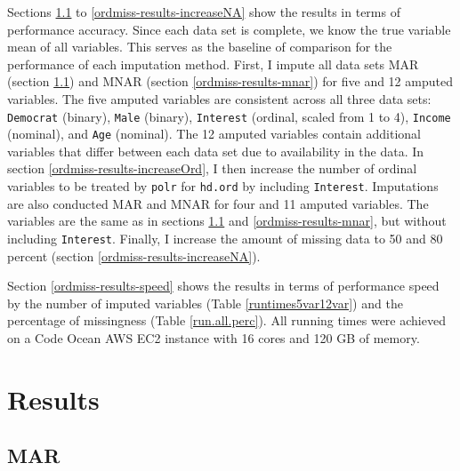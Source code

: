\documentclass[12pt,econ]{sources/authesis}
\begin{document}
Sections \ref{ordmiss-results-mar} to \ref{ordmiss-results-increaseNA} show the results in terms of performance accuracy. Since each data set is complete, we know the true variable mean of all variables. This serves as the baseline of comparison for the performance of each imputation method. First, I impute all data sets MAR (section \ref{ordmiss-results-mar}) and MNAR (section \ref{ordmiss-results-mnar}) for five and 12 amputed variables. The five amputed variables are consistent across all three data sets: \texttt{Democrat} (binary), \texttt{Male} (binary), \texttt{Interest} (ordinal, scaled from 1 to 4), \texttt{Income} (nominal), and \texttt{Age} (nominal). The 12 amputed variables contain additional variables that differ between each data set due to availability in the data. In section \ref{ordmiss-results-increaseOrd}, I then increase the number of ordinal variables to be treated by \texttt{polr} for \texttt{hd.ord} by including \texttt{Interest}. Imputations are also conducted MAR and MNAR for four and 11 amputed variables. The variables are the same as in sections \ref{ordmiss-results-mar} and \ref{ordmiss-results-mnar}, but without including \texttt{Interest}. Finally, I increase the amount of missing data to 50 and 80 percent (section \ref{ordmiss-results-increaseNA}).

Section \ref{ordmiss-results-speed} shows the results in terms of performance speed by the number of imputed variables (Table \ref{runtimes5var12var}) and the percentage of missingness (Table \ref{run.all.perc}). All running times were achieved on a Code Ocean AWS EC2 instance with 16 cores and 120 GB of memory.

\hypertarget{ordmiss-results}{%
\section{Results}\label{ordmiss-results}}

\hypertarget{ordmiss-results-mar}{%
\subsection{MAR}\label{ordmiss-results-mar}}
\end{document}
